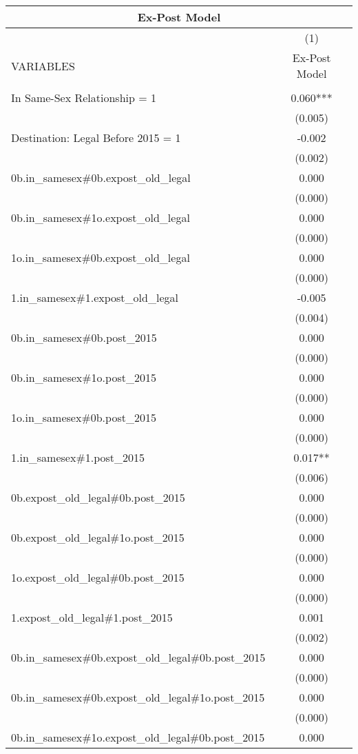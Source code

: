 \documentclass[]{article}
\begin{document}
\begin{tabular}{lc}
\multicolumn{2}{c}{Ex-Post Model} \\ \hline
 & (1) \\
VARIABLES & Ex-Post Model \\ \hline
 &  \\
In Same-Sex Relationship = 1 & 0.060*** \\
 & (0.005) \\
Destination: Legal Before 2015 = 1 & -0.002 \\
 & (0.002) \\
0b.in\_samesex\#0b.expost\_old\_legal & 0.000 \\
 & (0.000) \\
0b.in\_samesex\#1o.expost\_old\_legal & 0.000 \\
 & (0.000) \\
1o.in\_samesex\#0b.expost\_old\_legal & 0.000 \\
 & (0.000) \\
1.in\_samesex\#1.expost\_old\_legal & -0.005 \\
 & (0.004) \\
0b.in\_samesex\#0b.post\_2015 & 0.000 \\
 & (0.000) \\
0b.in\_samesex\#1o.post\_2015 & 0.000 \\
 & (0.000) \\
1o.in\_samesex\#0b.post\_2015 & 0.000 \\
 & (0.000) \\
1.in\_samesex\#1.post\_2015 & 0.017** \\
 & (0.006) \\
0b.expost\_old\_legal\#0b.post\_2015 & 0.000 \\
 & (0.000) \\
0b.expost\_old\_legal\#1o.post\_2015 & 0.000 \\
 & (0.000) \\
1o.expost\_old\_legal\#0b.post\_2015 & 0.000 \\
 & (0.000) \\
1.expost\_old\_legal\#1.post\_2015 & 0.001 \\
 & (0.002) \\
0b.in\_samesex\#0b.expost\_old\_legal\#0b.post\_2015 & 0.000 \\
 & (0.000) \\
0b.in\_samesex\#0b.expost\_old\_legal\#1o.post\_2015 & 0.000 \\
 & (0.000) \\
0b.in\_samesex\#1o.expost\_old\_legal\#0b.post\_2015 & 0.000 \\

\end{tabular}
\end{document}
